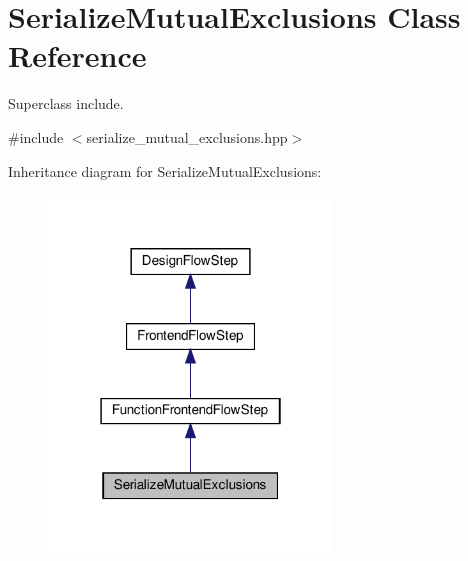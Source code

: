 \hypertarget{classSerializeMutualExclusions}{}\section{Serialize\+Mutual\+Exclusions Class Reference}
\label{classSerializeMutualExclusions}


Superclass include.  




{\ttfamily \#include $<$serialize\+\_\+mutual\+\_\+exclusions.\+hpp$>$}



Inheritance diagram for Serialize\+Mutual\+Exclusions\+:
\nopagebreak
\begin{figure}[H]
\begin{center}
\leavevmode
\includegraphics[width=214pt]{da/db3/classSerializeMutualExclusions__inherit__graph}
\end{center}
\end{figure}


